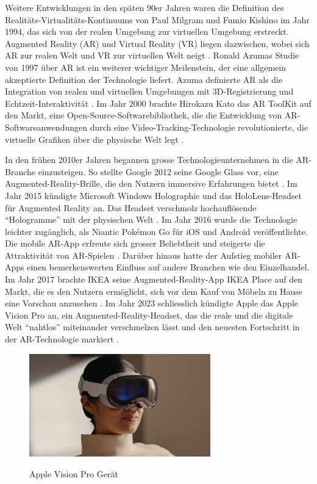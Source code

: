 \newpage 

Weitere Entwicklungen in den späten 90er Jahren waren die Definition des Realitäts-Virtualitäts-Kontinuums von Paul Milgram und Fumio Kishino im Jahr 1994, das sich von der realen Umgebung zur virtuellen Umgebung erstreckt. Augmented Reality (AR) und Virtual Reality (VR) liegen dazwischen, wobei sich AR zur realen Welt und VR zur virtuellen Welt neigt  \cite{Milgram94a}. Ronald Azumas Studie von 1997 über AR ist ein weiterer wichtiger Meilenstein, der eine allgemein akzeptierte Definition der Technologie liefert. Azuma definierte AR als die Integration von realen und virtuellen Umgebungen mit 3D-Registrierung und Echtzeit-Interaktivität \cite{Azuma1997ASO}. Im Jahr 2000 brachte Hirokazu Kato das AR ToolKit auf den Markt, eine Open-Source-Softwarebibliothek, die die Entwicklung von AR-Softwareanwendungen durch eine Video-Tracking-Technologie revolutionierte, die virtuelle Grafiken über die physische Welt legt \cite{ARTooLKIT}.

In den frühen 2010er Jahren begannen grosse Technologieunternehmen in die AR-Branche einzusteigen. So stellte Google 2012 seine Google Glass vor, eine Augmented-Reality-Brille, die den Nutzern immersive Erfahrungen bietet \cite{Google_for_Developer_2012}. Im Jahr 2015 kündigte Microsoft Windows Holographic und das HoloLens-Headset für Augmented Reality an. Das Headset verschmolz hochauflösende “Hologramme” mit der physischen Welt \cite{Tech_Discussion_2015}. Im Jahr 2016 wurde die Technologie leichter zugänglich, als Niantic Pokémon Go für iOS und Android veröffentlichte. Die mobile AR-App erfreute sich grosser Beliebtheit und steigerte die Attraktivität von AR-Spielen \cite{Bond_2016}. Darüber hinaus hatte der Aufstieg mobiler AR-Apps einen bemerkenswerten Einfluss auf andere Branchen wie den Einzelhandel. Im Jahr 2017 brachte IKEA seine Augmented-Reality-App IKEA Place auf den Markt, die es den Nutzern ermöglicht, sich vor dem Kauf von Möbeln zu Hause eine Vorschau anzusehen \cite{IKEA_2017}. Im Jahr 2023 schliesslich kündigte Apple das Apple Vision Pro an, ein Augmented-Reality-Headset, das die reale und die digitale Welt “nahtlos” miteinander verschmelzen lässt und den neuesten Fortschritt in der AR-Technologie markiert \cite{Apple}.

\vspace{1cm}

\begin{figure}[ht!]
    \centering
    \includegraphics[width=0.7\textwidth]{attachments/Vision_1.jpeg}
    \caption{Apple Vision Pro Gerät} \cite{Apple}
\end{figure}

